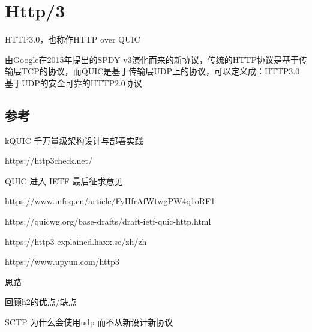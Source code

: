 \chapter{Http/3}
\label{chap:h3}

HTTP3.0，也称作HTTP over QUIC


由Google在2015年提出的SPDY v3演化而来的新协议，传统的HTTP协议是基于传输层TCP的协议，而QUIC是基于传输层UDP上的协议，可以定义成：HTTP3.0基于UDP的安全可靠的HTTP2.0协议.


\section{参考}

\href{https://www.infoq.cn/article/afncpsfmb3ufwehueak1}{kQUIC 千万量级架构设计与部署实践}

https://http3check.net/



QUIC 进入 IETF 最后征求意见

https://www.infoq.cn/article/FyHfrAfWtwgPW4q1oRF1

https://quicwg.org/base-drafts/draft-ietf-quic-http.html

https://http3-explained.haxx.se/zh/zh


https://www.upyun.com/http3


思路

回顾h2的优点/缺点

SCTP
为什么会使用udp 而不从新设计新协议


